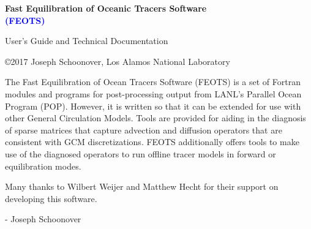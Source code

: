 \documentclass{softwaremanual}
\author{Joseph Schoonover, Wilbert Weijer, Jiaxu Zhang}
\date{}
\begin{document}
\frontmatter
\begin{titlingpage}
    
        \vspace*{2cm}

   {\selectfont
   \begin{center}
     \Large{\textbf{ Fast Equilibration of Oceanic Tracers Software  }}\\

     \Large{\textbf{\textcolor{blue}{(FEOTS)}}}
   \end{center}
    }    
 
        
        \vspace{2cm}
        
     \begin{center}
     
        { \selectfont
          \large{ User's Guide and Technical Documentation }\\
          \vspace{1.5cm}
          \textbf{\large{\theauthor}}
          
        }
        
        \vspace{8cm}
        
        \copyright 2017 Joseph Schoonover, Los Alamos National Laboratory
     \end{center}
        
    
\end{titlingpage}

The Fast Equilibration of Ocean Tracers Software (FEOTS) is a set of Fortran modules and programs for post-processing output from LANL's Parallel Ocean Program (POP). However, it is written so that it can be extended for use with other General Circulation Models. Tools are provided for aiding in the diagnosis of sparse matrices that capture advection and diffusion operators that are consistent with GCM discretizations. FEOTS additionally offers tools to make use of the diagnosed operators to run offline tracer models in forward or equilibration modes.


 Many thanks to Wilbert Weijer and Matthew Hecht for their support on developing this software.
  
 \begin{flushright}
 - Joseph Schoonover
 \end{flushright}
\end{document}

